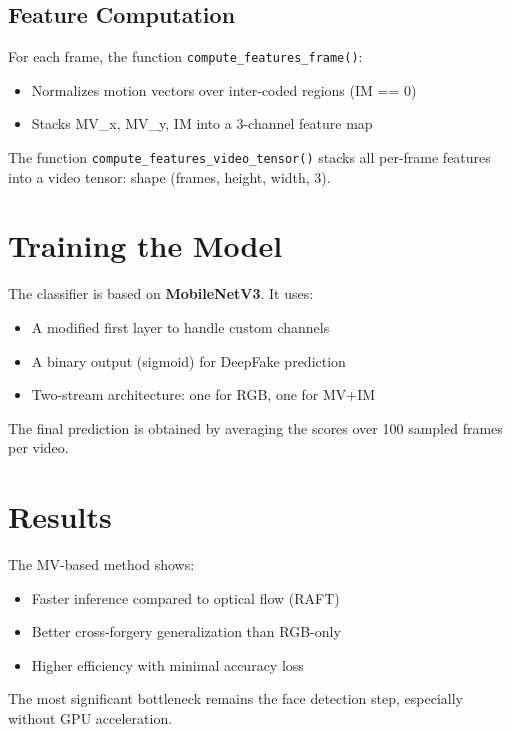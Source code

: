\documentclass[a4paper,12pt]{article}
\begin{document}
\subsection{Feature Computation}

For each frame, the function \texttt{compute\_features\_frame()}:
\begin{itemize}
  \item Normalizes motion vectors over inter-coded regions (IM == 0)
  \item Stacks MV\_x, MV\_y, IM into a 3-channel feature map
\end{itemize}

The function \texttt{compute\_features\_video\_tensor()} stacks all per-frame features into a video tensor: shape (frames, height, width, 3).

\section{Training the Model}

The classifier is based on \textbf{MobileNetV3}. It uses:
\begin{itemize}
  \item A modified first layer to handle custom channels
  \item A binary output (sigmoid) for DeepFake prediction
  \item Two-stream architecture: one for RGB, one for MV+IM
\end{itemize}

The final prediction is obtained by averaging the scores over 100 sampled frames per video.

\section{Results}

The MV-based method shows:
\begin{itemize}
  \item Faster inference compared to optical flow (RAFT)
  \item Better cross-forgery generalization than RGB-only
  \item Higher efficiency with minimal accuracy loss
\end{itemize}

The most significant bottleneck remains the face detection step, especially without GPU acceleration.
\end{document}
